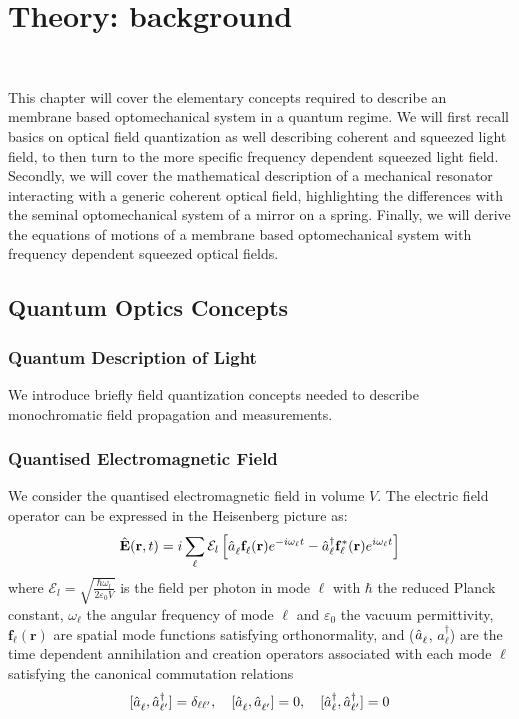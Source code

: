 \newcommand{\adag}[1]{\hat{a}_{#1}^\dagger}
\newcommand{\aop}[1]{\hat{a}_{#1\vphantom{\dagger}}}
\chapter{ Theory: background}
\minitoc\

This chapter will cover the elementary concepts required to describe an membrane based optomechanical system in a quantum regime. We will first recall basics on optical field quantization as well describing coherent and squeezed light field, to then turn to the more specific frequency dependent squeezed light field. Secondly, we will cover the mathematical description of a mechanical resonator interacting with a generic coherent optical field, highlighting the differences with the seminal optomechanical system of a mirror on a spring. Finally, we will derive the equations of motions of a membrane based optomechanical system with frequency dependent squeezed optical fields. 

\section{Quantum Optics Concepts}
\subsection{Quantum Description of Light}
We introduce briefly field quantization concepts needed to describe monochromatic field propagation and measurements.

\subsection*{Quantised Electromagnetic Field}

We consider the quantised electromagnetic field in volume $V$. The electric field operator can be expressed in the Heisenberg picture as:
\begin{equation}
\hat{\mathbf{E}}(\mathbf{r}, t) = i \sum_{ \ell} \mathcal{E}_l \left[\hat{a}_{\ell}^{\vphantom{dagger}}\mathbf{f}_{\ell}^{\vphantom{*}}(\mathbf{r})e^{-i\omega_{\ell}t} - \hat{a}_{\ell}^\dagger \mathbf{f}_{\ell}^*(\mathbf{r}) e^{i\omega_{\ell}t}\right]
\end{equation}
where $\mathcal{E}_l = \sqrt{\frac{\hbar \omega_l}{2 \varepsilon_0 V}}$ is the field per photon in mode $\ell$ with $\hbar$ the reduced Planck constant, $\omega_\ell$ the angular frequency of mode $\ell$ and $\varepsilon_0$ the vacuum permittivity, $\mathbf{f}_{\ell}(\mathbf{r})$ are spatial mode functions satisfying orthonormality, and ($\hat{a}_{\ell}^{\vphantom{\dagger}}$, $\hat{a}_{\ell}^{\dagger}$) are the time dependent annihilation and creation operators associated with each mode $\ell$ satisfying the canonical commutation relations
\[
[\hat{a}_{\ell}^{\vphantom{\dagger}}, \hat{a}_{\ell'}^\dagger] = \delta_{\ell \ell'} , \quad
[\hat{a}_{\ell}^{\vphantom{\dagger}}, \hat{a}_{\ell'}^{\vphantom{\dagger}} ] = 0, \quad [\hat{a}_{\ell}^\dagger , \hat{a}_{\ell'}^\dagger ] = 0  
\]
